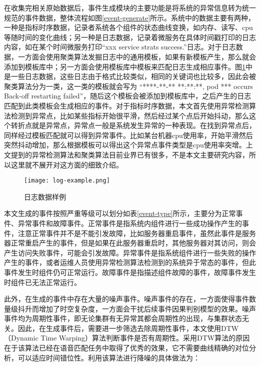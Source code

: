 在收集完相关原始数据后，事件生成模块的主要功能是将系统的异常信息转为统一规范的事件数据，整体流程如图\ref{event-generate}所示。系统中的数据主要有两种，一种是指标时序数据，记录者系统各个组件的状态曲线变换，如内存、读写、cpu等随时间的变化曲线；另一种是日志数据，记录着微服务在具体时间戳打印的日志内容，如在某个时间微服务打印“xxx service strats success.”日志。对于日志数据，一方面会使用聚类算法发掘日志中的通用模板，如果有新模板产生，那么就会添加到模板库中；另一方面会使用模板库中模板来匹配日志生成相应事件。图\ref{log-example}中是一些日志数据，这些日志由于格式比较类似，相同的关键词也比较多，因此会被聚类算法分为一类，这一类的模板就会写为 “****-**-** **:**:**, pod *** occurs Back-off restarting failed”，随后这个模板会被添加到模板库中，之后产生的日志匹配到此类模板会生成相应的事件。对于指标时序数据，本文首先使用异常检测算法检测到异常点，比如某些指标开始很平滑，然后经过某个点后开始抖动，那么这个转折点就是异常点，异常点一般是系统发生异常的一种表现。在找到异常点后，同样经过模板匹配就可以得到异常事件。比如某台机器cpu使用率，开始平滑然后突然抖动增加，那么根据模板可以得出这个异常点事件类型是cpu使用率突增。上文提到的异常检测算法\cite{yang2019integrated}和聚类算法\cite{landauer2020system}目前业界已有很多，不是本文主要研究内容，所以这里就不展开对这方面的细致介绍。

\begin{figure}[htbp]
    \centering
    \texttt{[image: log-example.png]}
    \caption{日志数据样例\label{log-example}}
\end{figure}

本文生成的事件按照严重等级可以划分如表\ref{event-type}所示，主要分为正常事件、异常事件和故障事件。正常事件是指系统内组件进行一些成功操作产生的事件，注意正常事件并不是不能引发故障，比如服务器重启事件，虽然此事件是服务器正常重启产生的事件，但是如果在此服务器重启时，其他服务器对其访问，则会产生访问失败事件，可能会引发故障。异常事件是指系统组件进行一些失败的操作产生的事件，或者运维人员使用异常检测算法检测到的系统异于常态的事件，但此事件发生时组件仍可正常运行。故障事件是指描述组件故障的事件，故障事件发生时组件已无法正常运行。

此外，在生成的事件中存在大量的噪声事件。噪声事件的存在，一方面使得事件数量级抖升而增加了时空复杂度，一方面会干扰后续事件因果判别模型的效果。噪声事件均为周期性事件，即无论集群有无异常其都会周期性的出现，与集群状态无关。因此，在生成事件后，需要进一步筛选去除周期性事件，本文使用DTW（Dynamic Time Warping）算法\cite{mueen2016extracting}判断事件是否有周期性。采用DTW算法的原因在于该算法已经在语音匹配任务中取得了优秀的效果，它不需要曲线精确的对位分析，可以适应时间错位性。利用该算法进行降噪的具体做法为：

